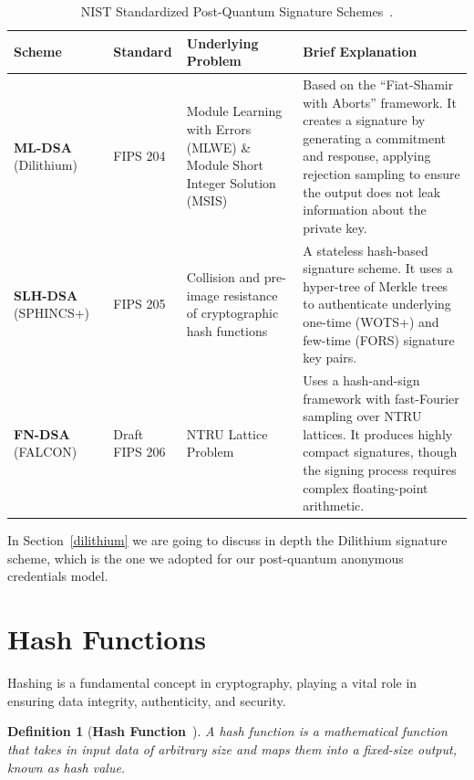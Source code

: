 \documentclass[binding=0.6cm,oneside,noexaminfo]{sapthesis}
\newtheorem{definition}{Definition}
\begin{document}
\begin{table}[H]
  \centering
  \caption{NIST Standardized Post-Quantum Signature Schemes~\cite{NIST_FIPS_204}.}
  \label{tab:pqc_signatures}
  \small
  \renewcommand{\arraystretch}{1.3}
  \begin{tabularx}{\textwidth}{|l|l|L|L|}
    \hline
    \textbf{Scheme} & \textbf{Standard} & \textbf{Underlying Problem} & \textbf{Brief Explanation} \\ \hline
    \textbf{ML-DSA} (Dilithium)~\cite{NIST2024FIPS204} & FIPS 204       & Module Learning with Errors (MLWE) \& Module Short Integer Solution (MSIS) & Based on the ``Fiat-Shamir with Aborts'' framework. It creates a signature by generating a commitment and response, applying rejection sampling to ensure the output does not leak information about the private key. \\ \hline
    \textbf{SLH-DSA} (SPHINCS+)~\cite{NIST2024FIPS205} & FIPS 205       & Collision and pre-image resistance of cryptographic hash functions       & A stateless hash-based signature scheme. It uses a hyper-tree of Merkle trees to authenticate underlying one-time (WOTS+) and few-time (FORS) signature key pairs. \\ \hline
    \textbf{FN-DSA} (FALCON)~\cite{Prest2024Falcon}    & Draft FIPS 206 & NTRU Lattice Problem                                                     & Uses a hash-and-sign framework with fast-Fourier sampling over NTRU lattices. It produces highly compact signatures, though the signing process requires complex floating-point arithmetic. \\ \hline
  \end{tabularx}
\end{table}

In Section~\ref{dilithium} we are going to discuss in depth the Dilithium signature scheme, 
which is the one we adopted for our post-quantum anonymous credentials model.

\section{Hash Functions}
\label{hashfunctions}
Hashing  is  a  fundamental  concept  in 
cryptography,  playing  a  vital  role  in  ensuring 
data  integrity, authenticity, and  security.

\begin{definition}[\textbf{Hash Function}~\cite{inproceedings}]
  A hash function is a mathematical function that takes in input data
  of arbitrary size and maps them into a fixed-size output, known as
  hash value.
\end{definition}
\end{document}
